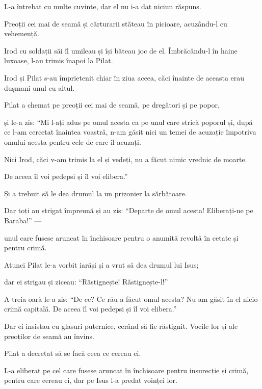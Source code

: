 {L-a întrebat cu multe cuvinte, dar el nu i-a dat niciun răspuns.

Preoții cei mai de seamă și cărturarii stăteau în picioare, acuzându-l cu vehemență.

Irod cu soldații săi îl umileau și își băteau joc de el. Îmbrăcându-l în haine luxoase, l-au trimis înapoi la Pilat.

Irod și Pilat s-au împrietenit chiar în ziua aceea, căci înainte de aceasta erau dușmani unul cu altul.


\par }{\PP {}Pilat a chemat pe preoții cei mai de seamă, pe dregători și pe popor,

și le-a zis: “Mi l-ați adus pe omul acesta ca pe unul care strică poporul și, după ce l-am cercetat înaintea voastră, n-am găsit nici un temei de acuzație împotriva omului acesta pentru cele de care îl acuzați.

Nici Irod, căci v-am trimis la el și vedeți, nu a făcut nimic vrednic de moarte.

De aceea îl voi pedepsi și îl voi elibera.”


\par }{\PP {}Și a trebuit să le dea drumul la un prizonier la sărbătoare.

Dar toți au strigat împreună și au zis: “Departe de omul acesta! Eliberați-ne pe Baraba!” —

unul care fusese aruncat în închisoare pentru o anumită revoltă în cetate și pentru crimă.


\par }{\PP {}Atunci Pilat le-a vorbit iarăși și a vrut să dea drumul lui Isus;

dar ei strigau și ziceau: “Răstignește! Răstignește-l!”


\par }{\PP {}A treia oară le-a zis: “De ce? Ce rău a făcut omul acesta? Nu am găsit în el nicio crimă capitală. De aceea îl voi pedepsi și îl voi elibera.”

Dar ei insistau cu glasuri puternice, cerând să fie răstignit. Vocile lor și ale preoților de seamă au învins.

Pilat a decretat să se facă ceea ce cereau ei.

L-a eliberat pe cel care fusese aruncat în închisoare pentru insurecție și crimă, pentru care cereau ei, dar pe Isus l-a predat voinței lor.


}
